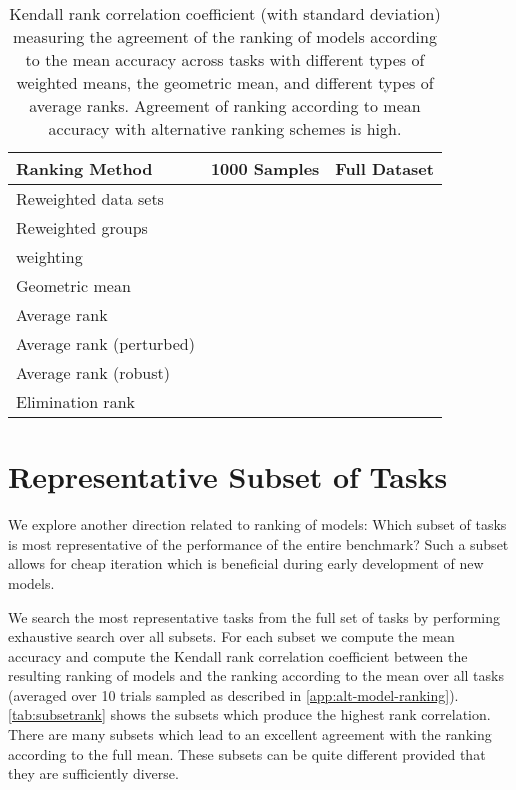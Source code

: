 \documentclass{article}
\begin{document}
\begin{table}[h]
\begin{center}
\begin{tabular}{lrr}
\toprule
\bf Ranking Method & \bf 1000 Samples & \bf Full Dataset \\
\toprule
Reweighted data sets &  &  \\
Reweighted groups &  &  \\
\citet{balduzzi2018} weighting &  &  \\
\midrule
Geometric mean &  &  \\
Average rank &  &  \\
Average rank (perturbed) &  &  \\
Average rank (robust) &  &  \\
Elimination rank &  &  \\
\bottomrule
\end{tabular}
 \caption{\label{tab:altrank} Kendall rank correlation coefficient \citep{kendall1945treatment} (with standard deviation) measuring the agreement of the ranking of models according to the mean accuracy across tasks with different types of weighted means, the geometric mean, and different types of average ranks. Agreement of ranking according to mean accuracy with alternative ranking schemes is high.}
\end{center}
\end{table}

\clearpage
\section{Representative Subset of Tasks \label{app:subset-model-ranking}}


We explore another direction related to ranking of models: Which subset of tasks is most representative of the performance of the entire benchmark? Such a subset allows for cheap iteration  which is beneficial during early development of new models. 

We search the most representative  tasks from the full set of  tasks by performing exhaustive search over all  subsets. For each subset we compute the mean accuracy and compute the Kendall rank correlation coefficient between the resulting ranking of models and the ranking according to the mean over all tasks (averaged over 10 trials sampled as described in \cref{app:alt-model-ranking}). \cref{tab:subsetrank} shows the subsets which produce the highest rank correlation. There are many subsets which lead to an excellent agreement with the ranking according to the full mean. These subsets can be quite different provided that they are sufficiently diverse.
\end{document}

